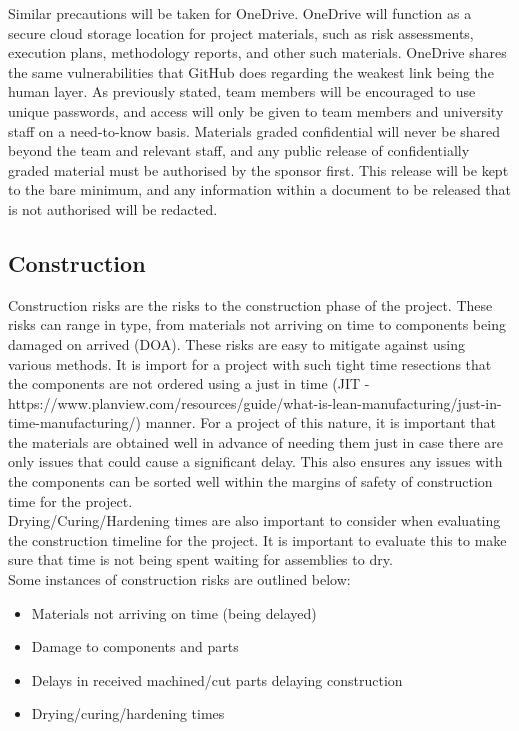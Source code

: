 \documentclass [12pt]{article}
\begin{document}
Similar precautions will be taken for OneDrive. OneDrive will function as a secure cloud storage location for project materials, such as risk assessments, execution plans, methodology reports, and other such materials. OneDrive shares the same vulnerabilities that GitHub does regarding the weakest link being the human layer. As previously stated, team members will be encouraged to use unique passwords, and access will only be given to team members and university staff on a need-to-know basis.
Materials graded confidential will never be shared beyond the team and relevant staff, and any public release of confidentially graded material must be authorised by the sponsor first. This release will be kept to the bare minimum, and any information within a document to be released that is not authorised will be redacted.

\subsection{Construction}\label{sec:Construction_Risk}

Construction risks are the risks to the construction phase of the project. These risks can range in type, from materials not arriving on time to components being damaged on arrived (DOA). These risks are easy to mitigate against using various methods. It is import for a project with such tight time resections that the components are not ordered using a just in time (JIT - https://www.planview.com/resources/guide/what-is-lean-manufacturing/just-in-time-manufacturing/) manner. For a project of this nature, it is important that the materials are obtained well in advance of needing them just in case there are only issues that could cause a significant delay. This also ensures any issues with the components can be sorted well within the margins of safety of construction time for the project.
\\ 
Drying/Curing/Hardening times are also important to consider when evaluating the construction timeline for the project. It is important to evaluate this to make sure that time is not being spent waiting for assemblies to dry.
\\
Some instances of construction risks are outlined below: 

\begin{itemize}
    \item Materials not arriving on time (being delayed)
    \item Damage to components and parts
    \item Delays in received machined/cut parts delaying construction
    \item Drying/curing/hardening times
\end{itemize}
\end{document}
